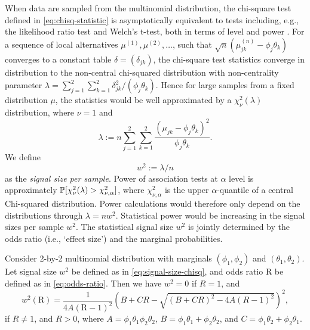 When data are sampled from the multinomial distribution, the chi-square test defined in \eqref{eq:chisq-statistic} is asymptotically equivalent to tests including, e.g., the likelihood ratio test and Welch's t-test, both in terms of level and power \cite{ferguson2017course,gao2019upass}.
For a sequence of local alternatives $\mu^{(1)}, \mu^{(2)}, \ldots$, such that $\sqrt{n}(\mu^{(n)}_{jk} - \phi_j\theta_k)$ converges to a constant table $\delta = (\delta_{jk})$, the chi-square test statistics converge in distribution to the non-central chi-squared distribution with non-centrality parameter 
$\lambda = \sum_{j=1}^2 \sum_{k=1}^2 {\delta_{jk}^2}/{(\phi_j\theta_k)}$.
Hence for large samples from a fixed distribution $\mu$, the statistics would be well approximated by a $\chi^2_\nu(\lambda)$ distribution, where $\nu=1$ and
\begin{equation} 
\lambda := n\sum_{j=1}^2 \sum_{k=1}^2 \frac{(\mu_{jk} - \phi_j\theta_k)^2}{\phi_j\theta_k}.
\end{equation}
We define 
\begin{equation} \label{eq:signal-size-chisq}
    w^2:=\lambda/n
\end{equation} 
as the \emph{signal size per sample}.
Power of association tests at $\alpha$ level is approximately $\P[\chi^2_{\nu}(\lambda)>\chi^2_{\nu,\alpha}]$, where $\chi^2_{\nu,\alpha}$ is the upper $\alpha$-quantile of a central Chi-squared distribution.
Power calculations would therefore only depend on the distributions through $\lambda=nw^2$. Statistical power would be increasing in the signal sizes per sample $w^2$.
The statistical signal size $w^2$ is jointly determined by the odds ratio (i.e., `effect size') and the marginal probabilities.

\begin{proposition} \label{prop:signal-size-odds-ratio}
Consider 2-by-2 multinomial distribution with marginals $(\phi_1, \phi_2)$ and $(\theta_1, \theta_2)$.
Let signal size $w^2$ be defined as in \eqref{eq:signal-size-chisq}, and odds ratio $\text{R}$ be defined as in \eqref{eq:odds-ratio}. 
Then we have $w^2 = 0$ if $R=1$, and
\begin{equation} \label{eq:signal-size-odds-ratio}
    w^2(\text{R}) =
    \frac{1}{4A(\text{R}-1)^2}\left(B+CR-\sqrt{(B+CR)^2-4A(R-1)^2}\right)^2,
\end{equation}
if $R\neq1$, and $R>0$, 
where $A = \phi_1\theta_1\phi_2\theta_2$, $B = \phi_1\theta_1+\phi_2\theta_2$, and $C = \phi_1\theta_2+\phi_2\theta_1$.
\end{proposition}

